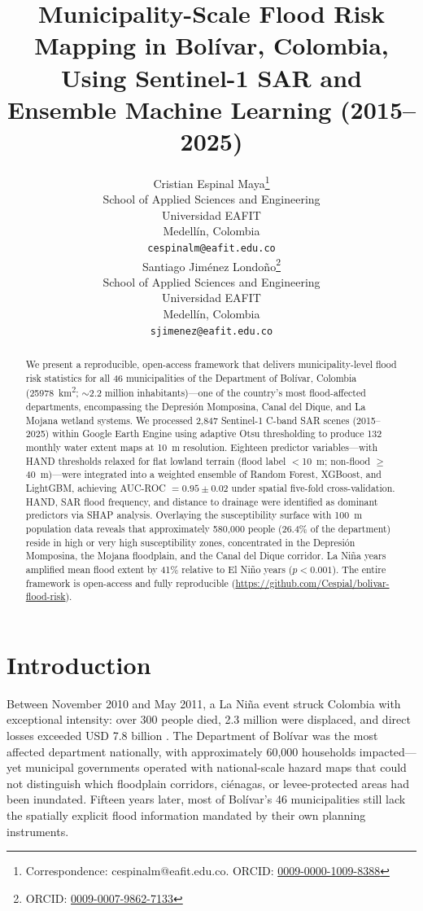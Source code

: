 \documentclass{article}
\title{Municipality-Scale Flood Risk Mapping in Bol\'ivar, Colombia, Using Sentinel-1 SAR and Ensemble Machine Learning (2015--2025)}
\author{
  Cristian Espinal Maya\thanks{Correspondence: cespinalm@eafit.edu.co. ORCID: \href{https://orcid.org/0009-0000-1009-8388}{0009-0000-1009-8388}} \\
  School of Applied Sciences and Engineering\\
  Universidad EAFIT\\
  Medell\'in, Colombia \\
  \texttt{cespinalm@eafit.edu.co} \\
  \And
  Santiago Jim\'enez Londo\~no\thanks{ORCID: \href{https://orcid.org/0009-0007-9862-7133}{0009-0007-9862-7133}} \\
  School of Applied Sciences and Engineering\\
  Universidad EAFIT\\
  Medell\'in, Colombia \\
  \texttt{sjimenez@eafit.edu.co} \\
}
\begin{document}
\maketitle

\begin{abstract}
We present a reproducible, open-access framework that delivers municipality-level flood risk statistics for all 46 municipalities of the Department of Bol\'ivar, Colombia (\SI{25978}{\kilo\metre\squared}; $\sim$2.2 million inhabitants)---one of the country's most flood-affected departments, encompassing the Depresi\'on Momposina, Canal del Dique, and La Mojana wetland systems. We processed 2,847 Sentinel-1 C-band SAR scenes (2015--2025) within Google Earth Engine using adaptive Otsu thresholding to produce 132 monthly water extent maps at \SI{10}{\metre} resolution. Eighteen predictor variables---with HAND thresholds relaxed for flat lowland terrain (flood label $<$\SI{10}{\metre}; non-flood $\geq$\SI{40}{\metre})---were integrated into a weighted ensemble of Random Forest, XGBoost, and LightGBM, achieving AUC-ROC $= 0.95 \pm 0.02$ under spatial five-fold cross-validation. HAND, SAR flood frequency, and distance to drainage were identified as dominant predictors via SHAP analysis. Overlaying the susceptibility surface with \SI{100}{\metre} population data reveals that approximately 580,000 people (26.4\% of the department) reside in high or very high susceptibility zones, concentrated in the Depresi\'on Momposina, the Mojana floodplain, and the Canal del Dique corridor. La Ni\~na years amplified mean flood extent by 41\% relative to El Ni\~no years ($p < 0.001$). The entire framework is open-access and fully reproducible (\url{https://github.com/Cespial/bolivar-flood-risk}).
\end{abstract}


\section{Introduction}
\label{sec:introduction}

Between November 2010 and May 2011, a La Ni\~na event struck Colombia with exceptional intensity: over 300 people died, 2.3 million were displaced, and direct losses exceeded USD 7.8 billion \citep{Hoyos2013}. The Department of Bol\'ivar was the most affected department nationally, with approximately 60,000 households impacted---yet municipal governments operated with national-scale hazard maps that could not distinguish which floodplain corridors, ci\'enagas, or levee-protected areas had been inundated. Fifteen years later, most of Bol\'ivar's 46 municipalities still lack the spatially explicit flood information mandated by their own planning instruments.
\end{document}
